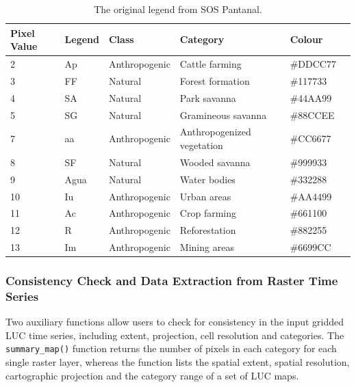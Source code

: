 \begin{table}[htbp]
\centering
\caption{The original legend from SOS Pantanal.}
\label{tab:legend_table}
\begin{tabular}[t]{llllll}
\hline
Pixel Value & Legend & Class      & Category                    & Colour \\
\hline
2        & Ap     & Anthropogenic & Cattle farming              & \#DDCC77 \\
3        & FF     & Natural       & Forest  formation           & \#117733 \\
4        & SA     & Natural       & Park savanna                & \#44AA99 \\
5        & SG     & Natural       & Gramineous savanna          & \#88CCEE \\
7        & aa     & Anthropogenic & Anthropogenized vegetation  & \#CC6677 \\
8        & SF     & Natural       & Wooded savanna              & \#999933 \\
9        & Agua   & Natural       & Water bodies                & \#332288 \\
10       & Iu     & Anthropogenic & Urban areas                 & \#AA4499 \\
11       & Ac     & Anthropogenic & Crop farming                & \#661100 \\
12       & R      & Anthropogenic & Reforestation               & \#882255 \\
13       & Im     & Anthropogenic & Mining areas                & \#6699CC \\
\hline
\end{tabular}
\end{table}

\hypertarget{consistency-check-and-data-extraction-from-raster-time-series}{%
\subsubsection{Consistency Check and Data Extraction from Raster Time
Series}\label{consistency-check-and-data-extraction-from-raster-time-series}}

Two auxiliary functions allow users to check for consistency in the
input gridded LUC time series, including extent, projection, cell
resolution and categories. The \texttt{summary\_map()} function returns
the number of pixels in each category for each single raster layer,
whereas the  function lists the spatial extent, spatial
resolution, cartographic projection and the category range of a set of
LUC maps.

